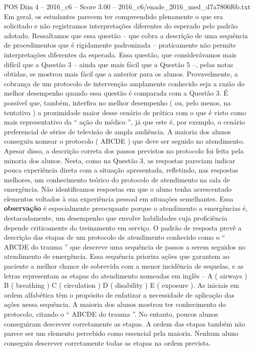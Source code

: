 \begin{textsample}{POS Dim 4 – 2016\_c6 – Score 3.00 – 2016\_c6/enade\_2016\_med\_d7a7806f6b.txt}
Em geral, os estudantes parecem ter compreendido plenamente o que era solicitado e não registramos interpretações diferentes do esperado pelo padrão adotado.
Ressaltamos que essa questão – que cobra a descrição de uma sequência de procedimentos que é rigidamente padronizada – praticamente não permite interpretações diferentes da esperada.
Essa questão, que considerávamos mais difícil que a Questão 3 – ainda que mais fácil que a Questão 5 –, pelas notas obtidas, se mostrou mais fácil que a anterior para os alunos.
Provavelmente, a cobrança de um protocolo de intervenção amplamente conhecido seja a razão do melhor desempenho quando essa questão é comparada com a Questão 3.
É possível que, também, interfira no melhor desempenho ( ou, pelo menos, na tentativa ) a proximidade maior desse cenário de prática com o que é visto como mais representativo da “ ação do médico ”, já que este é, por exemplo, o cenário preferencial de séries de televisão de ampla audiência.
A maioria dos alunos conseguiu nomear o protocolo ( ABCDE ) que deve ser seguido no atendimento.
Apesar disso, a descrição correta dos passos previstos no protocolo foi feita pela minoria dos alunos.
Nesta, como na Questão 3, as respostas pareciam indicar pouca experiência direta com a situação apresentada, refletindo, nas respostas melhores, um conhecimento teórico do protocolo de atendimento na sala de emergência.
Não identificamos respostas em que o aluno tenha acrescentado elementos voltados à sua experiência pessoal em situações semelhantes.
Essa \textbf{observação} é especialmente preocupante porque o atendimento a emergências é, destacadamente, um desempenho que envolve habilidades cuja proficiência depende criticamente do treinamento em serviço.
O padrão de resposta prevê a descrição das etapas de um protocolo de atendimento conhecido como o “ ABCDE do trauma ” que descreve uma sequência de passos a serem seguidos no atendimento de emergência.
Essa sequência prioriza ações que garantem ao paciente a melhor chance de sobrevida com a menor incidência de sequelas, e as letras representam as etapas do atendimento nomeadas em inglês – A ( airways ) B ( breathing ) C ( circulation ) D ( disability ) E ( exposure ).
As iniciais em ordem alfabética têm o propósito de enfatizar a necessidade de aplicação das ações nessa sequência.
A maioria dos alunos mostrou ter conhecimento do protocolo, citando o “ ABCDE do trauma ”.
No entanto, poucos alunos conseguiram descrever corretamente as etapas.
A ordem das etapas também não parece ser um elemento percebido como essencial pela maioria.
Nenhum aluno conseguiu descrever corretamente todas as etapas na ordem prevista.

\end{textsample}
